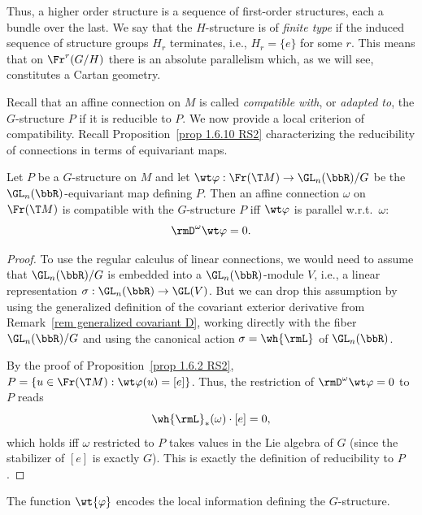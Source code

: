 \begin{rem}
    Thus, a higher order structure is a sequence of first-order structures, each a bundle over the last. We say that the $H$-structure is of \emph{finite type} if the induced sequence of structure groups $H_r$ terminates, i.e., $H_r=\{e\}$ for some $r$. This means that on $\Fr^r(G\slash H)$ there is an absolute parallelism which, as we will see, constitutes a Cartan geometry.
\end{rem}


Recall that an affine connection on $M$ is called \emph{compatible with}, or \emph{adapted to}, the $G$-structure $P$ if it is reducible to $P$. We now provide a local criterion of compatibility. Recall Proposition~\ref{prop 1.6.10 RS2} characterizing the reducibility of connections in terms of equivariant maps. 


\begin{prop}[{{\cite[Prop.~2.2.3]{RS2}}}]\label{prop 2.2.3 RS2}
    Let $P$ be a $G$-structure on $M$ and let $\wt\varphi:\Fr(\T M)\to \GL_n(\bbR)\slash G$ be the $\GL_n(\bbR)$-equivariant map defining $P$.  Then an affine connection $\omega$ on $\Fr(\T M)$ is compatible with the $G$-structure $P$ iff $\wt\varphi$ is parallel w.r.t.\ $\omega$:
    \[\rmD^\omega\wt\varphi=0.\]
\end{prop}
\begin{proof}
    To use the regular calculus of linear connections, we would need to assume that $\GL_n(\bbR)\slash G$ is embedded into a $\GL_n(\bbR)$-module $V$, i.e., a linear representation $\sigma:\GL_n(\bbR)\to \GL(V)$. But we can drop this assumption by using the generalized definition of the covariant exterior derivative from Remark~\ref{rem generalized covariant D}, working directly with the fiber $\GL_n(\bbR)\slash G$ and using the canonical action $\sigma=\wh{\rmL}$ of $\GL_n(\bbR)$.

    By the proof of Proposition~\ref{prop 1.6.2 RS2}, $P=\{u\in \Fr(\T M):\wt\varphi(u)=[e]\}$. Thus, the restriction of $\rmD^\omega\wt\varphi=0$ to $P$ reads 
    \[\wh{\rmL}_\ast(\omega)\cdot[e]=0,\]
    which holds iff $\omega$ restricted to $P$ takes values in the Lie algebra of $G$ (since the stabilizer of $[e]$ is exactly $G$). This is exactly the definition of reducibility to $P$.
\end{proof}

The function $\wt{\varphi}$ encodes the local information defining the $G$-structure. 

